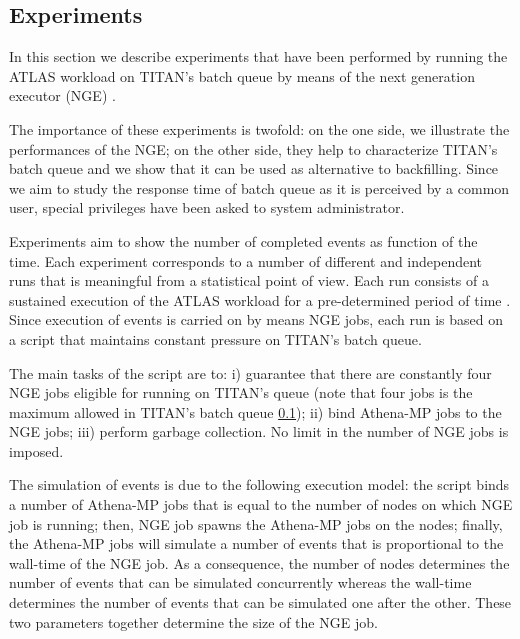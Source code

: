
\subsection{Experiments}

In this section we describe experiments that have been performed by running the ATLAS workload on TITAN's batch queue by means of the next generation executor (NGE) .

The importance  of these experiments is twofold: on the one side, we illustrate the performances of the NGE; on the other side, they help to characterize TITAN's batch queue and we show that it can be used as alternative to backfilling. Since we aim to study the response time of batch queue as it is perceived by a common user,  special privileges have been asked to system administrator. 


Experiments aim to show  the number of completed events as function of the time.
Each experiment corresponds to a number of different and independent runs that is meaningful from a statistical point of view.  Each run consists of a sustained execution of the ATLAS workload for a pre-determined period of time .  Since execution of events is carried on by means  NGE jobs, each run is based on a script that maintains constant pressure on TITAN's batch queue. 

The main tasks of the script are to:  i) guarantee that there are constantly four NGE jobs eligible for running on TITAN's queue (note that four jobs is the maximum allowed in TITAN's batch queue \ref{}); ii)  bind Athena-MP jobs to the NGE jobs; iii) perform garbage collection. No limit in the number of NGE jobs is imposed.

The simulation of events is due to the following execution model: the script binds a number of Athena-MP jobs that is equal to the number of nodes on which NGE job is running; then, NGE job spawns the Athena-MP jobs on the nodes; finally, the Athena-MP jobs will simulate a number of events that is proportional to the wall-time of the NGE job. As a consequence, the number of nodes determines the number of events that can be simulated concurrently whereas the wall-time determines the number of events that can be simulated one after the other. These two parameters together determine the size of the NGE job. 

